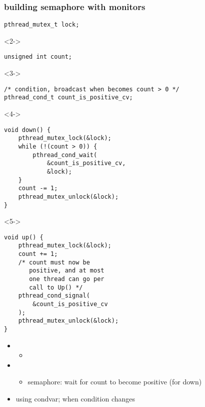 \begin{frame}[fragile,label=semaphoreWithMonitors]\frametitle{building semaphore with monitors}
\begin{lstlisting}
pthread_mutex_t lock;
\end{lstlisting}
\begin{visibleenv}<2->
\begin{lstlisting}
unsigned int count;
\end{lstlisting}
\end{visibleenv}
\begin{visibleenv}<3->
\begin{lstlisting}
/* condition, broadcast when becomes count > 0 */
pthread_cond_t count_is_positive_cv;
\end{lstlisting}
\end{visibleenv}
\begin{minipage}{0.45\textwidth}
\begin{visibleenv}<4->
\begin{lstlisting}
void down() {
    pthread_mutex_lock(&lock);
    while (!(count > 0)) {
        pthread_cond_wait(
            &count_is_positive_cv,
            &lock);
    }
    count -= 1;
    pthread_mutex_unlock(&lock);
}
\end{lstlisting}
\end{visibleenv}
\end{minipage}
\begin{minipage}{0.45\textwidth}
\begin{visibleenv}<5->
\begin{lstlisting}
void up() {
    pthread_mutex_lock(&lock);
    count += 1;
    /* count must now be
       positive, and at most
       one thread can go per
       call to Up() */
    pthread_cond_signal(
        &count_is_positive_cv
    );
    pthread_mutex_unlock(&lock);
}
\end{lstlisting}
\end{visibleenv}
\end{minipage}
\begin{itemize}
\item<1-> 
    \begin{itemize}
    \item<2-> 
    \end{itemize}
\item<3-> 
    \begin{itemize}
    \item semaphore: wait for count to become positive (for down)
    \end{itemize}
\item<4->  using condvar;  when condition changes
\end{itemize}
\end{frame}

